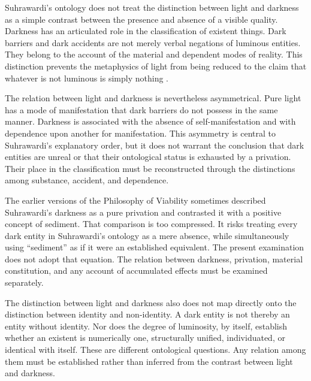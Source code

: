 \label{para:VS.B01.P01.C08.S14.SS06.P001}

Suhrawardi's ontology does not treat the distinction
between light and darkness as a simple contrast between
the presence and absence of a visible quality. Darkness
has an articulated role in the classification of
existent things. Dark barriers and dark accidents
are not merely verbal negations of luminous entities.
They belong to the account of the material and
dependent modes of reality. This distinction prevents
the metaphysics of light from being reduced to the
claim that whatever is not luminous is simply
nothing \citep[Part II, §§107--113]{SuhrawardiPhilosophyIllumination}.

\label{para:VS.B01.P01.C08.S14.SS06.P002}

The relation between light and darkness is nevertheless
asymmetrical. Pure light has a mode of manifestation
that dark barriers do not possess in the same manner.
Darkness is associated with the absence of self-manifestation
and with dependence upon another for manifestation.
This asymmetry is central to Suhrawardi's explanatory
order, but it does not warrant the conclusion that
dark entities are unreal or that their ontological
status is exhausted by a privation. Their place in
the classification must be reconstructed through
the distinctions among substance, accident, and
dependence.

\label{para:VS.B01.P01.C08.S14.SS06.P003}

The earlier versions of the Philosophy of Viability
sometimes described Suhrawardi's darkness as a pure
privation and contrasted it with a positive concept
of sediment. That comparison is too compressed.
It risks treating every dark entity in Suhrawardi's
ontology as a mere absence, while simultaneously
using ``sediment'' as if it were an established
equivalent. The present examination does not adopt
that equation. The relation between darkness,
privation, material constitution, and any account
of accumulated effects must be examined separately.

\label{para:VS.B01.P01.C08.S14.SS06.P004}

The distinction between light and darkness also
does not map directly onto the distinction between
identity and non-identity. A dark entity is not
thereby an entity without identity. Nor does the
degree of luminosity, by itself, establish whether
an existent is numerically one, structurally unified,
individuated, or identical with itself. These are
different ontological questions. Any relation among
them must be established rather than inferred from
the contrast between light and darkness.

